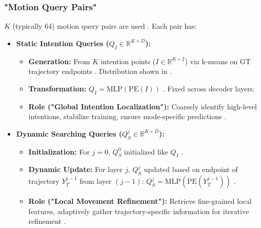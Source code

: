 \subsubsection{"Motion Query Pairs"}
$K$ (typically 64) motion query pairs are used \cite{Shi2022MTR, Shi2022MTR_A}. Each pair has:
\begin{itemize}
    \item \textbf{Static Intention Queries ($Q_I \in \mathbb{R}^{K \times D}$):}
    \begin{itemize}
        \item \textbf{Generation:} From $K$ intention points ($I \in \mathbb{R}^{K \times 2}$) via k-means on GT trajectory endpoints \cite{Shi2022MTR, Shi2022MTR_A}. Distribution shown in \cite{Shi2022MTR}.
        \item \textbf{Transformation:} $Q_I = \text{MLP}(\text{PE}(I))$ \cite{Shi2022MTR, Shi2022MTR_A}. Fixed across decoder layers.
        \item \textbf{Role ("Global Intention Localization"):} Coarsely identify high-level intentions, stabilize training, ensure mode-specific predictions \cite{Shi2022MTR, Shi2022MTR_A}.
    \end{itemize}
    \item \textbf{Dynamic Searching Queries ($Q_S^j \in \mathbb{R}^{K \times D}$):}
    \begin{itemize}
        \item \textbf{Initialization:} For $j=0$, $Q_S^0$ initialized like $Q_I$ \cite{Shi2022MTR}.
        \item \textbf{Dynamic Update:} For layer $j$, $Q_S^j$ updated based on endpoint of trajectory $Y_T^{j-1}$ from layer $(j-1)$: $Q_S^j = \text{MLP}(\text{PE}(Y_T^{j-1}))$ \cite{Shi2022MTR}.
        \item \textbf{Role ("Local Movement Refinement"):} Retrieve fine-grained local features, adaptively gather trajectory-specific information for iterative refinement \cite{Shi2022MTR, Shi2022MTR_A}.
    \end{itemize}
\end{itemize}

